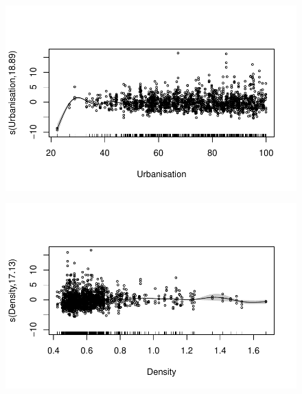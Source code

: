 \documentclass[
  letterpaper,
  DIV=11,
  numbers=noendperiod]{scrartcl}
\begin{document}
\begin{figure}[H]

{\centering \includegraphics{Group34Coursework_files/figure-pdf/unnamed-chunk-9-3.pdf}

}

\end{figure}

\begin{figure}[H]

{\centering \includegraphics{Group34Coursework_files/figure-pdf/unnamed-chunk-9-4.pdf}

}

\end{figure}
\end{document}
